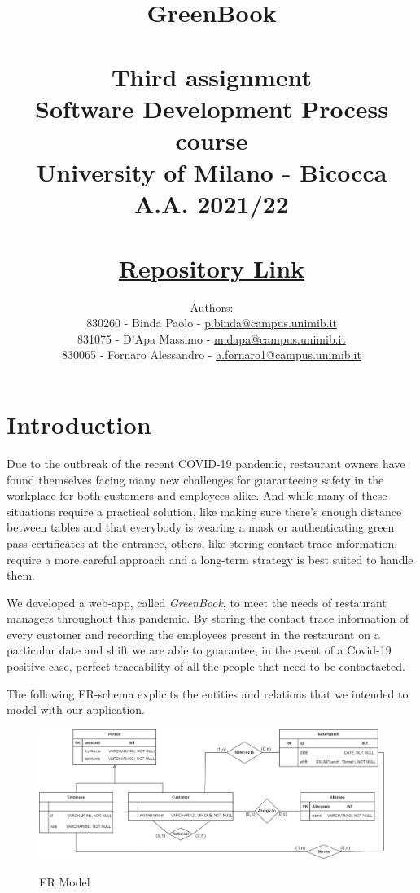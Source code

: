 \documentclass{article}
\title{\textbf{GreenBook}\\~\\
    Third assignment\\
    \small Software Development Process course\\
        University of Milano - Bicocca\\
        A.A. 2021/22\\~\\
        \href{https://gitlab.com/massimino96/2021_assignment3_greenbook/}{Repository Link}}
\author{Authors:\\
    830260 - Binda Paolo - \href{mailto:p.binda@campus.unimib.it}{p.binda@campus.unimib.it}\\
    831075 - D'Apa Massimo - \href{mailto:m.dapa@campus.unimib.it}{m.dapa@campus.unimib.it}\\
    830065 - Fornaro Alessandro - \href{mailto:a.fornaro1@campus.unimib.it}{a.fornaro1@campus.unimib.it}}
\date{}
\begin{document}
\setlength{\parindent}{0em}
\setlength{\parskip}{1em}

\maketitle
\thispagestyle{empty}

\cleardoublepage
\setcounter{page}{1}

\section*{Introduction}

Due to the outbreak of the recent COVID-19 pandemic, restaurant owners have found
themselves facing many new challenges for guaranteeing safety in the workplace for both
customers and employees alike. And while many of these situations require a practical
solution, like making sure there's enough distance between tables and that everybody
is wearing a mask or authenticating green pass certificates at the entrance, others, like
storing contact trace information, require a more careful approach and a long-term
strategy is best suited to handle them.


We developed a web-app, called \textit{GreenBook}, to meet the needs of restaurant 
managers throughout this pandemic. By storing the contact trace information of every 
customer and recording the employees present in the restaurant on a particular 
date and shift we are able to guarantee, in the event of a Covid-19 positive case,
perfect traceability of all the people that need to be contactacted.


The following ER-schema explicits the entities and relations that we intended
to model with our application.

\vspace{5mm}
\begin{figure}[H]
    \centering
    \includegraphics[width=\textwidth]{images/er_model.jpg}
    \label{fig:ermodel}
    \caption{ER Model}
\end{figure}
\end{document}

